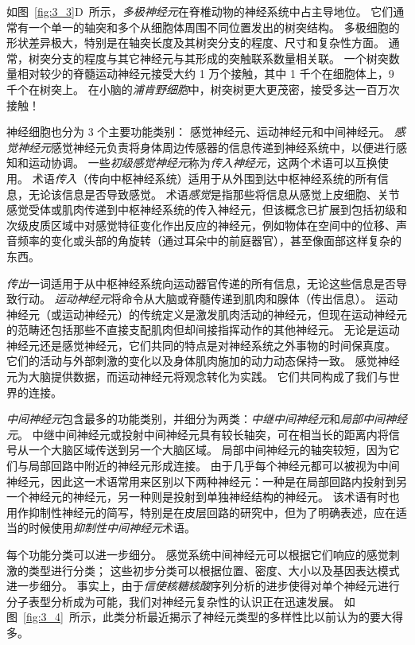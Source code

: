 如图~\ref{fig:3_3}D~所示，\textit{多极神经元}在脊椎动物的神经系统中占主导地位。 
它们通常有一个单一的轴突和多个从细胞体周围不同位置发出的树突结构。
多极细胞的形状差异极大，特别是在轴突长度及其树突分支的程度、尺寸和复杂性方面。 
通常，树突分支的程度与其它神经元与其形成的突触联系数量相关联。 
一个树突数量相对较少的脊髓运动神经元接受大约 1 万个接触，其中 1 千个在细胞体上，9 千个在树突上。
在小脑的\textit{浦肯野细胞}中，树突树更大更茂密，接受多达一百万次接触！


神经细胞也分为 3 个主要功能类别：
感觉神经元、运动神经元和中间神经元。 
\textit{感觉神经元}感觉神经元负责将身体周边传感器的信息传递到神经系统中，以便进行感知和运动协调。
一些\textit{初级感觉神经元}称为\textit{传入神经元}，这两个术语可以互换使用。 
术语\textit{传入}（传向中枢神经系统）适用于从外围到达中枢神经系统的所有信息，无论该信息是否导致感觉。
术语\textit{感觉}是指那些将信息从感觉上皮细胞、关节感觉受体或肌肉传递到中枢神经系统的传入神经元，但该概念已扩展到包括初级和次级皮质区域中对感觉特征变化作出反应的神经元，例如物体在空间中的位移、声音频率的变化或头部的角旋转（通过耳朵中的前庭器官），甚至像面部这样复杂的东西。


\textit{传出}一词适用于从中枢神经系统向运动器官传递的所有信息，无论这些信息是否导致行动。
\textit{运动神经元}将命令从大脑或脊髓传递到肌肉和腺体（传出信息）。 
运动神经元（或运动神经元）的传统定义是激发肌肉活动的神经元，但现在运动神经元的范畴还包括那些不直接支配肌肉但却间接指挥动作的其他神经元。
无论是运动神经元还是感觉神经元，它们共同的特点是对神经系统之外事物的时间保真度。
它们的活动与外部刺激的变化以及身体肌肉施加的动力动态保持一致。	
感觉神经元为大脑提供数据，而运动神经元将观念转化为实践。 
它们共同构成了我们与世界的连接。


\textit{中间神经元}包含最多的功能类别，并细分为两类：\textit{中继中间神经元}和\textit{局部中间神经元}。
中继中间神经元或投射中间神经元具有较长轴突，可在相当长的距离内将信号从一个大脑区域传送到另一个大脑区域。
局部中间神经元的轴突较短，因为它们与局部回路中附近的神经元形成连接。
由于几乎每个神经元都可以被视为中间神经元，因此这一术语常用来区别以下两种神经元：一种是在局部回路内投射到另一个神经元的神经元，另一种则是投射到单独神经结构的神经元。
该术语有时也用作抑制性神经元的简写，特别是在皮层回路的研究中，但为了明确表述，应在适当的时候使用\textit{抑制性中间神经元}术语。


每个功能分类可以进一步细分。 
感觉系统中间神经元可以根据它们响应的感觉刺激的类型进行分类； 
这些初步分类可以根据位置、密度、大小以及基因表达模式进一步细分。
事实上，由于\textit{信使核糖核酸}序列分析的进步使得对单个神经元进行分子表型分析成为可能，我们对神经元复杂性的认识正在迅速发展。 
如图~\ref{fig:3_4}~所示，此类分析最近揭示了神经元类型的多样性比以前认为的要大得多。


